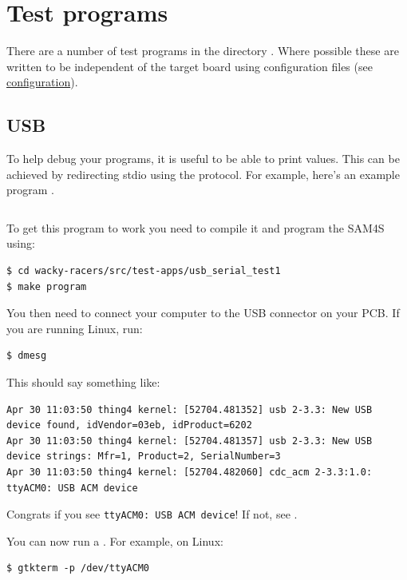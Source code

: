 \chapter{Test programs}
\label{test-programs}

There are a number of test programs in the directory
.  Where possible these are written to be
independent of the target board using configuration files (see
\protect\hyperref[configuration]{configuration}).


\section{USB}
\label{usb-interfacing}

To help debug your programs, it is useful to be able to print values.
This can be achieved by redirecting stdio using the  protocol.  For example, here's an example program
.

\inputminted{C}{../../src/test-apps/usb_serial_test1/usb_serial_test1.c}

To get this program to work you need to compile it and program the
SAM4S using:
%
\begin{verbatim}
$ cd wacky-racers/src/test-apps/usb_serial_test1
$ make program
\end{verbatim}

You then need to connect your computer to the USB connector on your PCB.
If you are running Linux, run:
%
\begin{verbatim}
$ dmesg
\end{verbatim}

This should say something like:
%
\begin{verbatim}
Apr 30 11:03:50 thing4 kernel: [52704.481352] usb 2-3.3: New USB device found, idVendor=03eb, idProduct=6202
Apr 30 11:03:50 thing4 kernel: [52704.481357] usb 2-3.3: New USB device strings: Mfr=1, Product=2, SerialNumber=3
Apr 30 11:03:50 thing4 kernel: [52704.482060] cdc_acm 2-3.3:1.0: ttyACM0: USB ACM device
\end{verbatim}

Congrats if you see \texttt{ttyACM0:\ USB\ ACM\ device}!  If not, see
.

You can now run a . For example, on Linux:
%
\begin{verbatim}
$ gtkterm -p /dev/ttyACM0
\end{verbatim}

